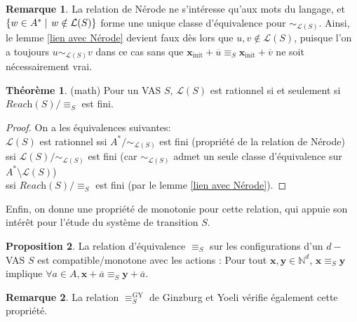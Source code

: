 \documentclass[a4paper,final]{article}
\theoremstyle{definition}
\newtheorem{Theorem}{Théorème}
\newtheorem{Proposition}[Theorem]{Proposition}
\newtheorem*{Remark}{Remarque}
\newcommand{\alain}[1]{\textcolor{blue}{#1}}
\newcommand{\set}[2]{\left\{#1\mathrel{\left|\vphantom{#1}\vphantom{#2}\right.}#2\right\}}
\newcommand{\N}{\ensuremath{\mathbb{N}}}
\newcommand{\lang}{\ensuremath{\mathcal{L}}}
\newcommand{\reach}{\ensuremath{\textit{Reach}}}
\newcommand{\vect}[1]{\ensuremath{\mathbf{#1}}}
\newcommand{\rel}{\ensuremath{\equiv}}
\newcommand{\relGY}{\ensuremath{\equiv^\text{GY}_S}}
\newcommand{\xinit}{\ensuremath{\vect{x}_\text{init}}}
\newcommand{\valeur}[1]{\ensuremath{\overline{#1}}}
\begin{document}

\begin{Remark}
La relation de Nérode ne s'intéresse qu'aux mots du langage, et $\set{w\in A^\ast}{w\notin\lang(S)}$ forme une unique classe d'équivalence pour $\sim_{\lang(S)}$.
Ainsi, le lemme \ref{lien avec Nérode} devient faux dès lors que $u,v\notin\lang(S)$, puisque l'on a toujours $u\sim_{\lang(S)}v$ dans ce cas sans que $\xinit +\valeur{u} \rel_S \xinit +\valeur{v}$ ne soit nécessairement vrai.
\end{Remark}


\begin{Theorem}\label{lien relation-rationnel}(math)
    Pour un VAS $S$, $\lang(S)$ est rationnel si et seulement si $\reach(S)/\rel_S$ est fini.
\end{Theorem}

\begin{proof}
On a les équivalences suivantes: \\
$\lang(S)$ est rationnel 
ssi $A^\ast/\sim_{\lang(S)}$ est fini (propriété de la relation de Nérode) \\
ssi $\lang(S)/\sim_{\lang(S)}$ est fini (car $\sim_{\lang(S)}$ admet un seule classe d'équivalence sur $A^\ast \setminus \lang(S)$) \\
ssi $\reach(S)/\rel_S$ est fini (par le lemme \ref{lien avec Nérode}).
\end{proof}

Enfin, on donne une propriété de monotonie pour cette relation, qui appuie son intérêt pour l'étude du système de transition $S$.

\begin{Proposition}\label{Monotonie relation}
La relation d'équivalence $\rel_S$ sur les configurations d'un $d-$VAS $S$ est compatible/monotone avec les actions :
Pour tout $\vect{x},\vect{y} \in\N^d$, $\vect{x}\rel_S \vect{y}$ implique $\forall a\in A, \vect{x} +\valeur{a} \rel_S \vect{y} +\valeur{a}$.
\end{Proposition}

\begin{Remark}
La relation $\relGY$ de Ginzburg et Yoeli vérifie également cette propriété.
\end{Remark}
\end{document}
